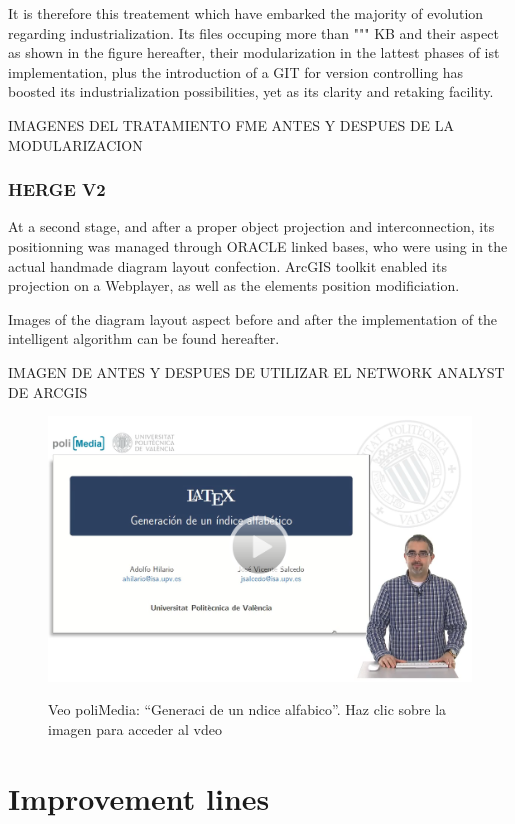 It is therefore this treatement which have embarked the majority of evolution regarding industrialization. Its files occuping more than """ KB and their aspect as shown in the figure hereafter, their modularization in the lattest phases of ist implementation, plus the introduction of a GIT for version controlling has boosted its industrialization possibilities, yet as its clarity and retaking facility.

IMAGENES DEL TRATAMIENTO FME ANTES Y DESPUES DE LA MODULARIZACION

\subsubsection{HERGE V2}

At a second stage, and after a proper object projection and interconnection, its positionning was managed through ORACLE linked bases, who were using in the actual handmade diagram layout confection. ArcGIS toolkit enabled its projection on a Webplayer, as well as the elements position modificiation. 

Images of the diagram layout aspect before and after the implementation of the intelligent algorithm can be found hereafter.

IMAGEN DE ANTES Y DESPUES DE UTILIZAR EL NETWORK ANALYST DE ARCGIS


\begin{figure}[h!]
	\bigskip
	\begin{center}
		\parbox{.45\textwidth}{%
		\href{https://polimedia.upv.es/visor/?id=c73f835e-9387-7643-9473-335796a00932}
			{\includegraphics[width = .45\textwidth]{0.figuras/poliMedia_makeindex.png}}}\hfill
		\parbox[t]{.45\textwidth}{\caption{Veo poliMedia: ``Generaci de un ndice alfabico''.
			Haz clic sobre la imagen para acceder al vdeo}
			\label{fig:makeindex}} 
	\end{center}
\end{figure}
\section{Improvement lines}

